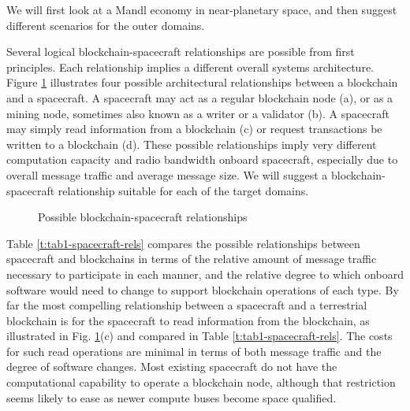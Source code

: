 \documentclass[journal ]{new-aiaa}
\begin{document}
We will first look at a Mandl economy in near-planetary space, and then suggest different scenarios for the outer domains.

Several logical blockchain-spacecraft relationships are possible from first principles. Each relationship implies a different overall systems architecture. Figure \ref{f:fig2-blockchain-arch} illustrates four possible architectural relationships between a blockchain and a spacecraft. A spacecraft may act as a regular blockchain node (a), or as a mining node, sometimes also known as a writer or a 
validator
 (b). A spacecraft may simply read information from a blockchain (c) or request transactions be written to a blockchain (d). These possible relationships imply very different computation capacity and radio bandwidth onboard spacecraft, especially due to overall message traffic and average message size. We will suggest a blockchain-spacecraft relationship suitable for each of the target domains.

\begin{figure}[htb!]%
 \caption{Possible blockchain-spacecraft relationships}
 \label{f:fig2-blockchain-arch}
\end{figure}

Table \ref{t:tab1-spacecraft-rels} compares the possible relationships between spacecraft and blockchains in terms of the relative amount of message traffic necessary to participate in each manner, and the relative degree to which onboard software would need to change to support blockchain operations of each type. By far the most compelling relationship between a spacecraft and a terrestrial blockchain is for the spacecraft to read information from the blockchain, as illustrated in Fig. \ref{f:fig2-blockchain-arch}(c) and compared in Table \ref{t:tab1-spacecraft-rels}. The costs for such read operations are minimal in terms of both message traffic and the degree of software changes. Most existing spacecraft do not have the computational capability to operate a blockchain node, although that restriction seems likely to ease as newer compute buses become space qualified.
\end{document}
